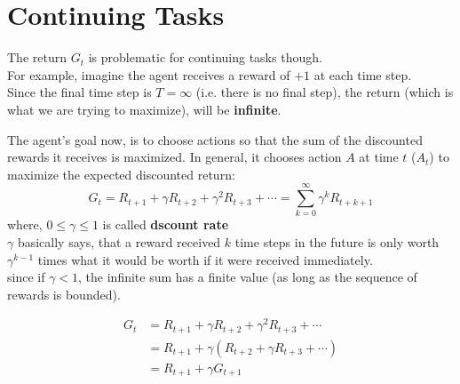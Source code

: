 \section{Continuing Tasks \cite{medium-introduction-to-reinforcement-learning-rl-part-3-finite-markov-decision-processes-51e1f8d3ddb7}}

The return $G_t$ is problematic for continuing tasks though.\\
For example, imagine the agent receives a reward of $+1$ at each time step.\\
Since the final time step is $T = \infty$ (i.e. there is no final step), the return (which is what we are trying to maximize), will be \textbf{infinite}.

The agent’s goal now, is to choose actions so that the sum of the discounted rewards it receives is maximized.
In general, it chooses action $A$ at time $t$ ($A_t$) to maximize the expected discounted return:
\[
    G_t = R_{t+1} + \gamma R_{t+2} + \gamma^2 R_{t+3} + \cdots = \sum_{k=0}^{\infty} \gamma^k R_{t+k+1}
\]
where, $0 \leq \gamma \leq 1$ is called \textbf{dscount rate}\\
$\gamma$ basically says, that a reward received $k$ time steps in the future is only worth $\gamma^{k-1}$ times what it would be worth if it were received immediately.\\
since if $\gamma < 1$, the infinite sum has a finite value (as long as the sequence of rewards is bounded).

\begin{align}
    G_t &= R_{t+1} + \gamma R_{t+2} + \gamma^2 R_{t+3} + \cdots \\
    &= R_{t+1} + \gamma (R_{t+2} + \gamma R_{t+3} + \cdots)\\
    &= R_{t+1} + \gamma G_{t+1}
\end{align}

